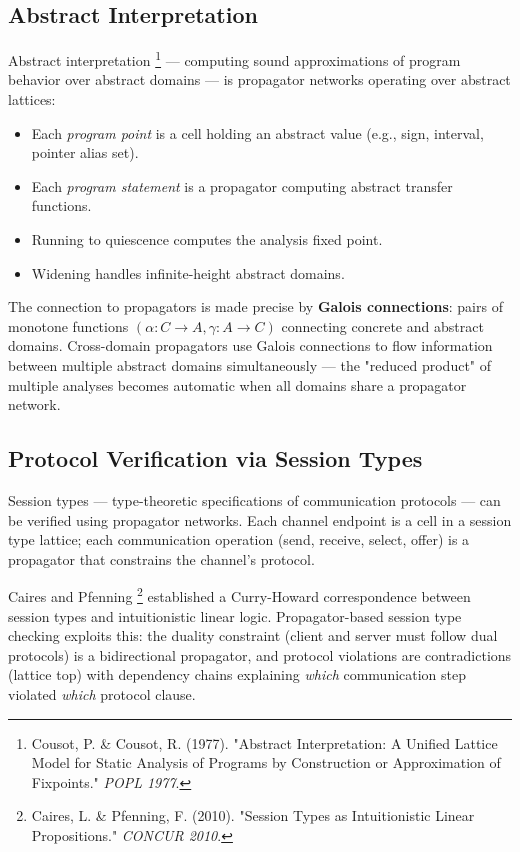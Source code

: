 \documentclass[11pt]{article}
\begin{document}
\subsection{Abstract Interpretation}
\label{sec:org9053461}

Abstract interpretation \footnote{Cousot, P. \& Cousot, R. (1977). "Abstract
Interpretation: A Unified Lattice Model for Static Analysis of Programs
by Construction or Approximation of Fixpoints." \emph{POPL 1977}.} --- computing sound
approximations of program behavior over abstract domains --- is
propagator networks operating over abstract lattices:

\begin{itemize}
\item Each \emph{program point} is a cell holding an abstract value (e.g., sign,
interval, pointer alias set).
\item Each \emph{program statement} is a propagator computing abstract transfer
functions.
\item Running to quiescence computes the analysis fixed point.
\item Widening handles infinite-height abstract domains.
\end{itemize}

The connection to propagators is made precise by \textbf{Galois connections}:
pairs of monotone functions \((\alpha : C \to A, \gamma : A \to C)\)
connecting concrete and abstract domains. Cross-domain propagators use
Galois connections to flow information between multiple abstract domains
simultaneously --- the "reduced product" of multiple analyses becomes
automatic when all domains share a propagator network.
\subsection{Protocol Verification via Session Types}
\label{sec:orgabb0b61}

Session types --- type-theoretic specifications of communication
protocols --- can be verified using propagator networks. Each channel
endpoint is a cell in a session type lattice; each communication
operation (send, receive, select, offer) is a propagator that constrains
the channel's protocol.

Caires and Pfenning \footnote{Caires, L. \& Pfenning, F. (2010). "Session Types
as Intuitionistic Linear Propositions." \emph{CONCUR 2010}.} established a Curry-Howard
correspondence between session types and intuitionistic linear logic.
Propagator-based session type checking exploits this: the duality
constraint (client and server must follow dual protocols) is a
bidirectional propagator, and protocol violations are contradictions
(lattice top) with dependency chains explaining \emph{which} communication
step violated \emph{which} protocol clause.
\end{document}
